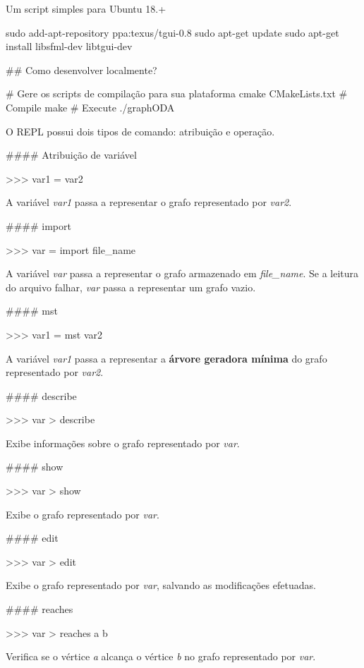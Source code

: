 \href{https://travis-ci.com/pds2-dcc-ufmg/2019-1-grupo19}{\tt }

Um script simples para Ubuntu 18.+ 
\begin{DoxyCode}
sudo add-apt-repository ppa:texus/tgui-0.8
sudo apt-get update
sudo apt-get install libsfml-dev libtgui-dev
\end{DoxyCode}


\#\# Como desenvolver localmente? 
\begin{DoxyCode}
# Gere os scripts de compilação para sua plataforma
cmake CMakeLists.txt
# Compile
make
# Execute
./graphODA
\end{DoxyCode}


O R\+E\+PL possui dois tipos de comando\+: atribuição e operação.

\#\#\#\# Atribuição de variável 
\begin{DoxyCode}
>>> var1 = var2
\end{DoxyCode}
 A variável {\itshape var1} passa a representar o grafo representado por {\itshape var2}.

\#\#\#\# import 
\begin{DoxyCode}
>>> var = import file\_name
\end{DoxyCode}
 A variável {\itshape var} passa a representar o grafo armazenado em {\itshape file\+\_\+name}. Se a leitura do arquivo falhar, {\itshape var} passa a representar um grafo vazio.

\#\#\#\# mst 
\begin{DoxyCode}
>>> var1 = mst var2
\end{DoxyCode}
 A variável {\itshape var1} passa a representar a {\bfseries árvore geradora mínima} do grafo representado por {\itshape var2}.

\#\#\#\# describe 
\begin{DoxyCode}
>>> var > describe
\end{DoxyCode}
 Exibe informações sobre o grafo representado por {\itshape var}.

\#\#\#\# show 
\begin{DoxyCode}
>>> var > show
\end{DoxyCode}
 Exibe o grafo representado por {\itshape var}.

\#\#\#\# edit 
\begin{DoxyCode}
>>> var > edit
\end{DoxyCode}
 Exibe o grafo representado por {\itshape var}, salvando as modificações efetuadas.

\#\#\#\# reaches 
\begin{DoxyCode}
>>> var > reaches a b
\end{DoxyCode}
 Verifica se o vértice {\itshape a} alcança o vértice {\itshape b} no grafo representado por {\itshape var}.

